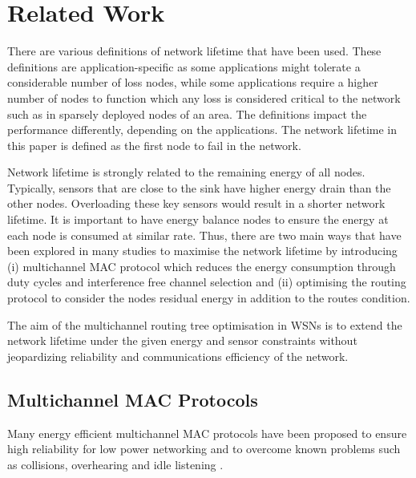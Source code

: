 \section{Related Work}
\label{RelatedWork}

There are various definitions of network lifetime that have been used. These definitions are application-specific as some applications might tolerate a considerable number of loss nodes, while some applications require a higher number of nodes to function which any loss is considered critical to the network such as in sparsely deployed nodes of an area. The definitions impact the performance differently, depending on the applications. The network lifetime in this paper is defined as the first node to fail in the network.

Network lifetime is strongly related to the remaining energy of all nodes. Typically, sensors that are close to the sink have higher energy drain than the other nodes. Overloading these key sensors would result in a shorter network lifetime.
It is important to have energy balance nodes to ensure the energy at each node is consumed at similar rate.
Thus, there are two main ways that have been explored in many studies to maximise the network lifetime by introducing (i) multichannel MAC protocol which reduces the energy consumption through duty cycles and interference free channel selection and (ii) optimising the routing protocol to consider the nodes residual energy in addition to the routes condition.

The aim of the multichannel routing tree optimisation in WSNs is to extend the network lifetime under the given energy and sensor constraints without jeopardizing reliability and communications efficiency of the network.

\subsection{Multichannel MAC Protocols}
Many energy efficient multichannel MAC protocols have been proposed to ensure high reliability for low power networking and to overcome known problems such as collisions, overhearing and idle listening .


